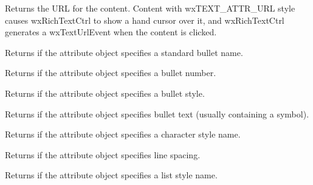 
Returns the URL for the content. Content with wxTEXT\_ATTR\_URL style
causes wxRichTextCtrl to show a hand cursor over it, and wxRichTextCtrl generates
a wxTextUrlEvent when the content is clicked.

\label{wxtextattrexhasbulletname}


Returns \true if the attribute object specifies a standard bullet name.

\label{wxtextattrexhasbulletnumber}


Returns \true if the attribute object specifies a bullet number.

\label{wxtextattrexhasbulletstyle}


Returns \true if the attribute object specifies a bullet style.

\label{wxtextattrexhasbullettext}


Returns \true if the attribute object specifies bullet text (usually containing a symbol).

\label{wxtextattrexhascharacterstylename}


Returns \true if the attribute object specifies a character style name.

\label{wxtextattrexhaslinespacing}


Returns \true if the attribute object specifies line spacing.

\label{wxtextattrexhasliststylename}


Returns \true if the attribute object specifies a list style name.

\label{wxtextattrexhasoutlinelevel}

